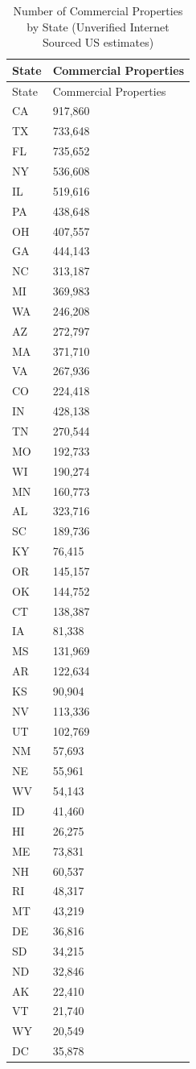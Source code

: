 \documentclass[
  12pt]{article}
\begin{document}
\begin{longtable}[]{@{}ll@{}}
\caption{Number of Commercial Properties by State (Unverified Internet
Sourced US estimates)}\label{tbl-State}\tabularnewline
\toprule\noalign{}
State & Commercial Properties \\
\midrule\noalign{}
\endfirsthead
\toprule\noalign{}
State & Commercial Properties \\
\midrule\noalign{}
\endhead
\bottomrule\noalign{}
\endlastfoot
CA & 917,860 \\
TX & 733,648 \\
FL & 735,652 \\
NY & 536,608 \\
IL & 519,616 \\
PA & 438,648 \\
OH & 407,557 \\
GA & 444,143 \\
NC & 313,187 \\
MI & 369,983 \\
WA & 246,208 \\
AZ & 272,797 \\
MA & 371,710 \\
VA & 267,936 \\
CO & 224,418 \\
IN & 428,138 \\
TN & 270,544 \\
MO & 192,733 \\
WI & 190,274 \\
MN & 160,773 \\
AL & 323,716 \\
SC & 189,736 \\
KY & 76,415 \\
OR & 145,157 \\
OK & 144,752 \\
CT & 138,387 \\
IA & 81,338 \\
MS & 131,969 \\
AR & 122,634 \\
KS & 90,904 \\
NV & 113,336 \\
UT & 102,769 \\
NM & 57,693 \\
NE & 55,961 \\
WV & 54,143 \\
ID & 41,460 \\
HI & 26,275 \\
ME & 73,831 \\
NH & 60,537 \\
RI & 48,317 \\
MT & 43,219 \\
DE & 36,816 \\
SD & 34,215 \\
ND & 32,846 \\
AK & 22,410 \\
VT & 21,740 \\
WY & 20,549 \\
DC & 35,878 \\
\end{longtable}
\end{document}
